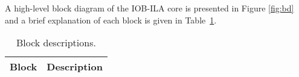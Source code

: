
A high-level block diagram of the IOB-ILA core is presented in
Figure \ref{fig:bd} and a brief explanation of each block is given in
Table~\ref{tab:blocks}.



\begin{table}[H]
  \centering
    \begin{tabularx}{\textwidth}{ | c | X | }
    \hline
    \rowcolor{iob-green}
    {\bf Block} & {\bf Description} \\ \hline
    
    

    \end{tabularx}
  \caption{Block descriptions.}
  \label{tab:blocks}
\end{table}
